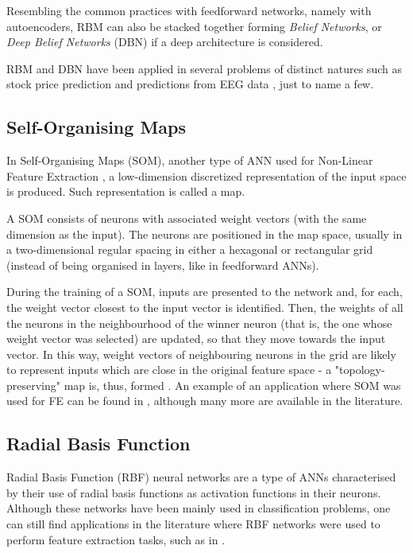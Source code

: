 \documentclass[9pt,journal,compsoc]{IEEEtran}
\begin{document}
Resembling the common practices with feedforward networks, namely with autoencoders, RBM can also be stacked together forming \emph{Belief Networks}, or \emph{Deep Belief Networks} (DBN) \cite{hinton2009deep} if a deep architecture is considered.

RBM and DBN have been applied in several problems of distinct natures such as stock price prediction\cite{cai2012feature} and predictions from EEG data \cite{hajinoroozi2015feature}, just to name a few.

\subsection{Self-Organising Maps}

In Self-Organising Maps (SOM), another type of ANN used for Non-Linear Feature Extraction \cite{jain2000statistical, hira2015review}, a low-dimension discretized representation of the input space is produced. Such representation is called a map.

A SOM consists of neurons with associated weight vectors (with the same dimension as the input). The neurons are positioned in the map space, usually in a two-dimensional regular spacing in either a hexagonal or rectangular grid (instead of being organised in layers, like in feedforward ANNs).

During the training of a SOM, inputs are presented to the network and, for each, the weight vector closest to the input vector is identified. Then, the weights of all the neurons in the neighbourhood of the winner neuron (that is, the one whose weight vector was selected) are updated, so that they move towards the input vector. In this way, weight vectors of neighbouring neurons in the grid are likely to represent inputs which are close in the original feature space - a "topology-preserving" map is, thus, formed \cite{kohonen1995self, villmann1997topology}. An example of an application where SOM was used for FE can be found in \cite{lawrence1997face}, although many more are available in the literature.

\subsection{Radial Basis Function}

Radial Basis Function (RBF) neural networks are a type of ANNs characterised by their use of radial basis functions as activation functions in their neurons. Although these networks have been mainly used in classification problems, one can still find applications in the literature where RBF networks were used to perform feature extraction tasks, such as in \cite{lowe1997neuroscale}.
\end{document}

